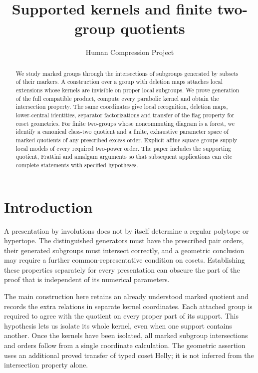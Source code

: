 
\title{Supported kernels and finite two-group quotients}
\author{Human Compression Project}
\date{}

\maketitle
\begin{abstract}
We study marked groups through the intersections of subgroups generated
by subsets of their markers. A construction over a group with deletion
maps attaches local extensions whose kernels are invisible on proper
local subgroups. We prove generation of the full compatible product,
compute every parabolic kernel and obtain the intersection property. The
same coordinates give local recognition, deletion maps, lower-central
identities, separator factorizations and transfer of the flag property
for coset geometries. For finite two-groups whose noncommuting diagram
is a forest, we identify a canonical class-two quotient and a finite,
exhaustive parameter space of marked quotients of any prescribed excess
order. Explicit affine square groups supply local models of every
required two-power order. The paper includes the supporting quotient,
Frattini and amalgam arguments so that subsequent applications can cite
complete statements with specified hypotheses.
\end{abstract}
\section{Introduction}
A presentation by involutions does not by itself determine a regular
polytope or hypertope. The distinguished generators must have the
prescribed pair orders, their generated subgroups must intersect
correctly, and a geometric conclusion may require a further
common-representative condition on cosets. Establishing these properties
separately for every presentation can obscure the part of the proof that
is independent of its numerical parameters.

The main construction here retains an already understood marked quotient
and records the extra relations in separate kernel coordinates. Each
attached group is required to agree with the quotient on every proper
part of its support. This hypothesis lets us isolate its whole kernel,
even when one support contains another. Once the kernels have been
isolated, all marked subgroup intersections and orders follow from a
single coordinate calculation. The geometric assertion uses an
additional proved transfer of typed coset Helly; it is not inferred from
the intersection property alone.

